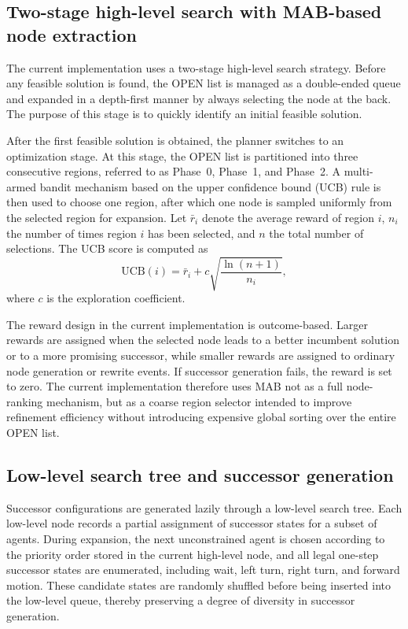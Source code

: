 \documentclass[lettersize,journal]{IEEEtran}
\begin{document}
\subsection{Two-stage high-level search with MAB-based node extraction}
\label{subsec:impl_highlevel_search}

The current implementation uses a two-stage high-level search strategy. Before any feasible solution is found, the OPEN list is managed as a double-ended queue and expanded in a depth-first manner by always selecting the node at the back. The purpose of this stage is to quickly identify an initial feasible solution. 

After the first feasible solution is obtained, the planner switches to an optimization stage. At this stage, the OPEN list is partitioned into three consecutive regions, referred to as Phase~0, Phase~1, and Phase~2. A multi-armed bandit mechanism based on the upper confidence bound (UCB) rule is then used to choose one region, after which one node is sampled uniformly from the selected region for expansion. Let $\bar r_i$ denote the average reward of region $i$, $n_i$ the number of times region $i$ has been selected, and $n$ the total number of selections. The UCB score is computed as
\[
\mathrm{UCB}(i)=\bar r_i + c\sqrt{\frac{\ln(n+1)}{n_i}},
\]
where $c$ is the exploration coefficient. 

The reward design in the current implementation is outcome-based. Larger rewards are assigned when the selected node leads to a better incumbent solution or to a more promising successor, while smaller rewards are assigned to ordinary node generation or rewrite events. If successor generation fails, the reward is set to zero. The current implementation therefore uses MAB not as a full node-ranking mechanism, but as a coarse region selector intended to improve refinement efficiency without introducing expensive global sorting over the entire OPEN list. 

\subsection{Low-level search tree and successor generation}
\label{subsec:impl_lowlevel_generation}

Successor configurations are generated lazily through a low-level search tree. Each low-level node records a partial assignment of successor states for a subset of agents. During expansion, the next unconstrained agent is chosen according to the priority order stored in the current high-level node, and all legal one-step successor states are enumerated, including wait, left turn, right turn, and forward motion. These candidate states are randomly shuffled before being inserted into the low-level queue, thereby preserving a degree of diversity in successor generation. 
\end{document}

